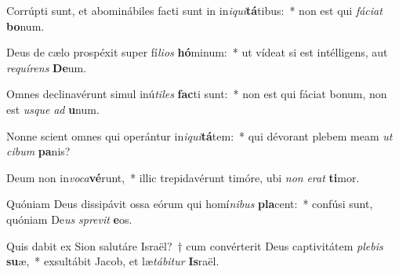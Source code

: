\item Corrúpti sunt, et abominábiles facti sunt in in\textit{i}\textit{qui}\textbf{tá}tibus:~* non est qui \textit{fá}\textit{ci}\textit{at} \textbf{bo}num.
\item Deus de cælo prospéxit super fí\textit{li}\textit{os} \textbf{hó}minum:~* ut vídeat si est intélligens, aut \textit{re}\textit{quí}\textit{rens} \textbf{De}um.
\item Omnes declinavérunt simul inú\textit{ti}\textit{les} \textbf{fac}ti sunt:~* non est qui fáciat bonum, non est \textit{us}\textit{que} \textit{ad} \textbf{u}num.
\item Nonne scient omnes qui operántur in\textit{i}\textit{qui}\textbf{tá}tem:~* qui dévorant plebem meam \textit{ut} \textit{ci}\textit{bum} \textbf{pa}nis?
\item Deum non in\textit{vo}\textit{ca}\textbf{vé}runt,~* illic trepidavérunt timóre, ubi \textit{non} \textit{e}\textit{rat} \textbf{ti}mor.
\item Quóniam Deus dissipávit ossa eórum qui homí\textit{ni}\textit{bus} \textbf{pla}cent:~* confúsi sunt, quóniam De\textit{us} \textit{spre}\textit{vit} \textbf{e}os.
\item Quis dabit ex Sion salutáre Israël?~† cum convérterit Deus captivitátem \textit{ple}\textit{bis} \textbf{su}æ,~* exsultábit Jacob, et læ\textit{tá}\textit{bi}\textit{tur} \textbf{Is}raël.
